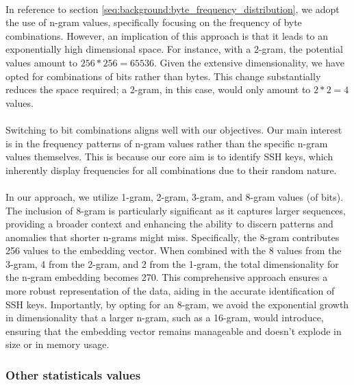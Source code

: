         \paragraph{}In reference to section \ref{seq:background:byte_frequency_distribution}, we adopt the use of n-gram values, specifically focusing on the frequency of byte combinations. However, an implication of this approach is that it leads to an exponentially high dimensional space. For instance, with a 2-gram, the potential values amount to $256*256=65536$. Given the extensive dimensionality, we have opted for combinations of bits rather than bytes. This change substantially reduces the space required; a 2-gram, in this case, would only amount to $2*2=4$ values.

        \paragraph{}Switching to bit combinations aligns well with our objectives. Our main interest is in the frequency patterns of n-gram values rather than the specific n-gram values themselves. This is because our core aim is to identify SSH keys, which inherently display frequencies for all combinations due to their random nature.

        \paragraph{}In our approach, we utilize 1-gram, 2-gram, 3-gram, and 8-gram values (of bits). The inclusion of 8-gram is particularly significant as it captures larger sequences, providing a broader context and enhancing the ability to discern patterns and anomalies that shorter n-grams might miss. Specifically, the 8-gram contributes 256 values to the embedding vector. When combined with the 8 values from the 3-gram, 4 from the 2-gram, and 2 from the 1-gram, the total dimensionality for the n-gram embedding becomes 270. This comprehensive approach ensures a more robust representation of the data, aiding in the accurate identification of SSH keys. Importantly, by opting for an 8-gram, we avoid the exponential growth in dimensionality that a larger n-gram, such as a 16-gram, would introduce, ensuring that the embedding vector remains manageable and doesn't explode in size or in memory usage.
        

    \subsubsection{Other statisticals values}
